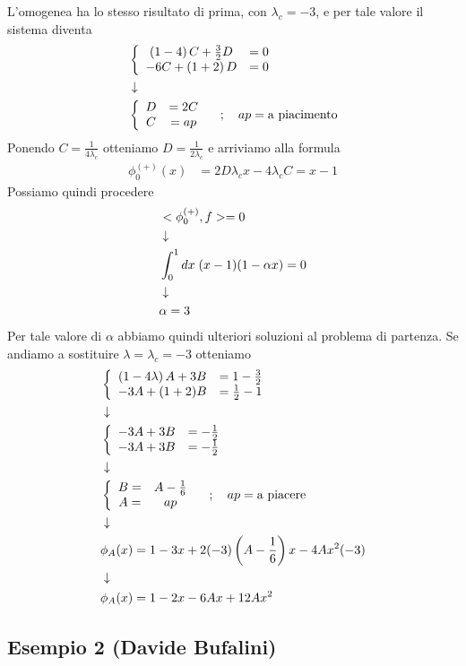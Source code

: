 \begin{enumerate}
	L'omogenea ha lo stesso risultato di prima, con $\lambda_c = -3$, e per tale valore il sistema diventa
	\begin{align}
		&\left\{ \begin{array}{cc} \left(1 -4 \right) C + \frac{3}{2} D &= 0\\ -6 C + \left( 1 +2 \right) D &=0 \end{array} \right. \\ &\downarrow \nonumber \\
		&\left\{ \begin{array}{cc} D &= 2C\\ C &= ap \end{array} \right. \quad ; \quad ap = \text{a piacimento}
	\end{align}
	Ponendo $C = \frac{1}{4\lambda_c}$ otteniamo $D = \frac{1}{2 \lambda_c}$ e arriviamo alla formula
	\begin{align}
		\phi_0^{(+)}(x) &= 2D \lambda_c x - 4 \lambda_c C = x-1
	\end{align}
	Possiamo quindi procedere
	\begin{align}
		&<\phi_0^{(+)},f> = 0 \\ &\downarrow \nonumber \\
		&\int_{0}^{1} dx \; (x-1) (1-\alpha x) =0\nonumber \\ &\downarrow \nonumber \\
		&\alpha = 3
	\end{align}
	Per tale valore di $\alpha$ abbiamo quindi ulteriori soluzioni al problema di partenza. Se andiamo a sostituire $\lambda = \lambda_c = -3$ otteniamo
	\begin{align}
		&\left\{ \begin{array}{cc} \left(1 -4 \lambda\right) A +3B &= 1 - \frac{3}{2}\\ -3A + (1+2)B &= \frac{1}{2}-1 \end{array} \right. \\ &\downarrow \nonumber \\
		&\left\{ \begin{array}{cc} -3A +3B &= - \frac{1}{2}\\ -3A + 3B &= -\frac{1}{2} \end{array} \right. \nonumber \\ &\downarrow \nonumber \\
		&\left\{ \begin{array}{cc} B = &A - \frac{1}{6}\\ A = &ap \end{array} \right. \quad ; \quad ap= \text{a piacere} \nonumber \\ &\downarrow \nonumber \\
		&\phi_A(x) = 1 -3x +2 (-3)\left(A - \frac{1}{6}\right)x -4Ax^2(-3) \nonumber \\ &\downarrow \nonumber \\
		&\phi_A(x) = 1 -2x -6Ax +12Ax^2
	\end{align}
\end{enumerate}

\newpage

\subsection{Esempio 2 (Davide Bufalini)}

